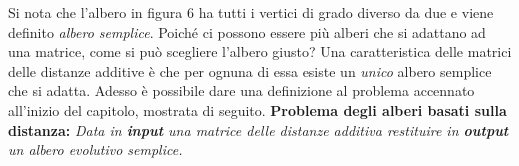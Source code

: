 \newline
Si nota che l'albero in figura 6 ha tutti i vertici di grado diverso da due e viene definito \textit{albero semplice}.
\newline
Poiché ci possono essere più alberi che si adattano ad una matrice, come si può scegliere l'albero giusto? Una caratteristica delle matrici delle distanze additive è che per ognuna di essa esiste un \textit{unico} albero semplice che si adatta.
\newline
Adesso è possibile dare una definizione al problema accennato all'inizio del capitolo, mostrata di seguito.
\newline
\newline
\textbf{Problema degli alberi basati sulla distanza:}
\newline
\textit{Data in \textbf{input} una matrice delle distanze additiva restituire in \textbf{output} un albero evolutivo semplice.}

\newpage

